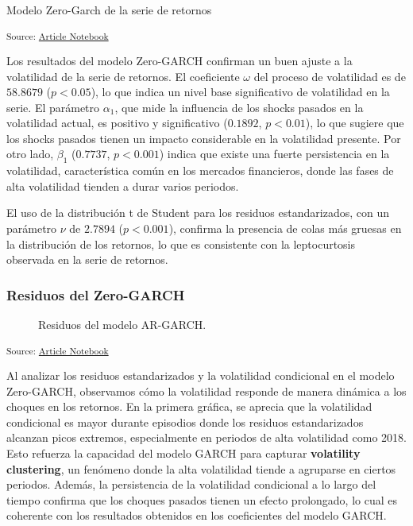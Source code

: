 \documentclass[
  number,
  preprint,
  3p,
  onecolumn]{elsarticle}
\begin{document}
Modelo Zero-Garch de la serie de retornos

\textsubscript{Source:
\href{https://iancont.github.io/fixed_income_garch/index-preview.html}{Article
Notebook}}

Los resultados del modelo Zero-GARCH confirman un buen ajuste a la
volatilidad de la serie de retornos. El coeficiente \(\omega\) del
proceso de volatilidad es de \(58.8679\) (\(p < 0.05\)), lo que indica
un nivel base significativo de volatilidad en la serie. El parámetro
\(\alpha_1\), que mide la influencia de los shocks pasados en la
volatilidad actual, es positivo y significativo (\(0.1892\),
\(p < 0.01\)), lo que sugiere que los shocks pasados tienen un impacto
considerable en la volatilidad presente. Por otro lado, \(\beta_1\)
(\(0.7737\), \(p < 0.001\)) indica que existe una fuerte persistencia en
la volatilidad, característica común en los mercados financieros, donde
las fases de alta volatilidad tienden a durar varios periodos.

El uso de la distribución t de Student para los residuos estandarizados,
con un parámetro \(\nu\) de \(2.7894\) (\(p < 0.001\)), confirma la
presencia de colas más gruesas en la distribución de los retornos, lo
que es consistente con la leptocurtosis observada en la serie de
retornos.

\subsubsection{Residuos del Zero-GARCH}\label{residuos-del-zero-garch}

\begin{figure}[H]


\caption{\label{fig-garch-residuals}Residuos del modelo AR-GARCH.}

\end{figure}%

\textsubscript{Source:
\href{https://iancont.github.io/fixed_income_garch/index-preview.html}{Article
Notebook}}

Al analizar los residuos estandarizados y la volatilidad condicional en
el modelo Zero-GARCH, observamos cómo la volatilidad responde de manera
dinámica a los choques en los retornos. En la primera gráfica, se
aprecia que la volatilidad condicional es mayor durante episodios donde
los residuos estandarizados alcanzan picos extremos, especialmente en
periodos de alta volatilidad como 2018. Esto refuerza la capacidad del
modelo GARCH para capturar \textbf{volatility clustering}, un fenómeno
donde la alta volatilidad tiende a agruparse en ciertos periodos.
Además, la persistencia de la volatilidad condicional a lo largo del
tiempo confirma que los choques pasados tienen un efecto prolongado, lo
cual es coherente con los resultados obtenidos en los coeficientes del
modelo GARCH.
\end{document}
